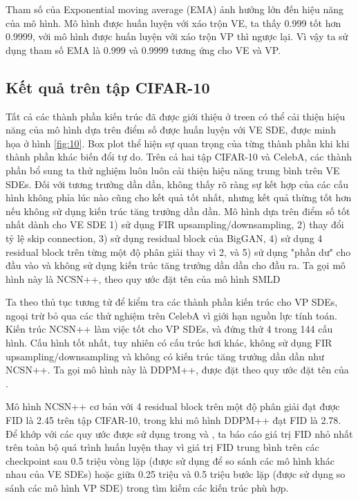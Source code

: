 \documentclass{article} %
\begin{document}
Tham số của Exponential moving average (EMA) ảnh hưởng lớn đến hiệu năng của mô hình.
Mô hình được huấn luyện với xáo trộn VE, ta thấy 0.999 tốt hơn 0.9999, với mô hình được huấn luyện với xáo trộn VP thì ngược lại.
Vì vậy ta sử dụng tham số EMA là 0.999 và 0.9999 tương ứng cho VE và VP.

\subsection{Kết quả trên tập CIFAR-10}

Tất cả các thành phần kiến trúc đã được giới thiệu ở treen có thể cải thiện hiệu năng của mô hình dựa trên điểm số được huấn luyện với VE SDE, được minh họa ở hình \ref{fig:10}.
Box plot thể hiện sự quan trọng của từng thành phần khi khi thành phần khác biến đổi tự do.
Trên cả hai tập CIFAR-10 và CelebA, các thành phần bổ sung ta thử nghiệm luôn luôn cải thiện hiệu năng trung bình trên VE SDEs.
Đối với tương trưởng dần dần, không thấy rõ ràng sự kết hợp của các cấu hình không phỉa lúc nào cũng cho kết quả tốt nhất, nhưng kết quả thừng tốt hơn nếu không sử dụng kiến trúc tăng trưởng dần dần.
Mô hình dựa trên điểm số tốt nhất dành cho VE SDE 1) sử dụng FIR upsampling/downsampling, 2) thay đổi tỷ lệ skip connection, 3) sử dụng residual block của BigGAN, 4) sử dụng 4 residual block trên từng một độ phân giải thay vì 2, và 5) sử dụng "phần dư" cho đầu vào và không sử dụng kiến trúc tăng trưởng dần dần cho đầu ra.
Ta gọi mô hình này là NCSN++, theo quy ước đặt tên của mô hình SMLD \citep{song2019generative, song2020improved}

Ta theo thủ tục tương tử để kiểm tra các thành phần kiến trúc cho VP SDEs, ngoại trừ bỏ qua các thử nghiệm trên CelebA vì giới hạn nguồn lực tính toán.
Kiến trúc NCSN++ làm việc tốt cho VP SDEs, và đứng thứ 4 trong 144 cấu hình.
Cấu hình tốt nhất, tuy nhiên có cấu trúc hơi khác, không sử dụng FIR upsampling/downsampling và không có kiến trúc tăng trưởng dần dần như NCSN++.
Ta gọi mô hình này là DDPM++, được đặt theo quy ước đặt tên của \citep{ho2020denoising}.

Mô hình NCSN++ cơ bản với 4 residual block trên một độ phân giải đạt được FID là 2.45 trên tập CIFAR-10,
trong khi mô hình DDPM++ đạt FID là 2.78.
Để khớp với các quy ước được sử dụng trong \citep{karras2018progressive,song2019generative} và \citep{ho2020denoising}, ta báo cáo giá trị FID nhỏ nhất trên toàn bộ quá trình huấn luyện thay vì giá trị FID trung bình trên các checkpoint sau 0.5 triệu vòng lặp (được sử dụng để so sánh các mô hình khác nhau của VE SDEs) hoặc giữa 0.25 triệu và 0.5 triệu bước lặp (được sử dụng so sánh các mô hình VP SDE) trong tìm kiếm các kiến trúc phù hợp.
\end{document}
